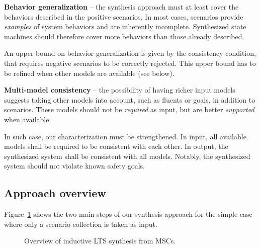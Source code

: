 \noindent \textbf{Behavior generalization} -- the synthesis approach must at least cover the behaviors described in the positive scenarios. In most cases, scenarios provide \emph{examples} of system behaviors and are inherently incomplete. Synthesized state machines should therefore cover more behaviors than those already described. 

An upper bound on behavior generalization is given by the consistency condition, that requires negative scenarios to be correctly rejected. This upper bound has to be refined when other models are available (see below).

\noindent \textbf{Multi-model consistency} -- the possibility of having richer input models suggests taking other models into account, such as fluents or goals, in addition to scenarios. These models should not be \emph{required} as input, but are better \emph{supported} when available. 

In such case, our characterization must be strengthened. In input, all available models shall be required to be consistent with each other. In output, the synthesized system shall be consistent with all models. Notably, the synthesized system should not violate known safety goals.


\subsection{Approach overview\label{subsection:inductive-synthesis-approach}}

Figure~\ref{image:inductive-synthesis-overview} shows the two main steps of our synthesis approach for the simple case where only a scenario collection is taken as input. 

\begin{figure}[H]\centering
  \caption{Overview of inductive LTS synthesis from MSCs.\label{image:inductive-synthesis-overview}}
\end{figure}

